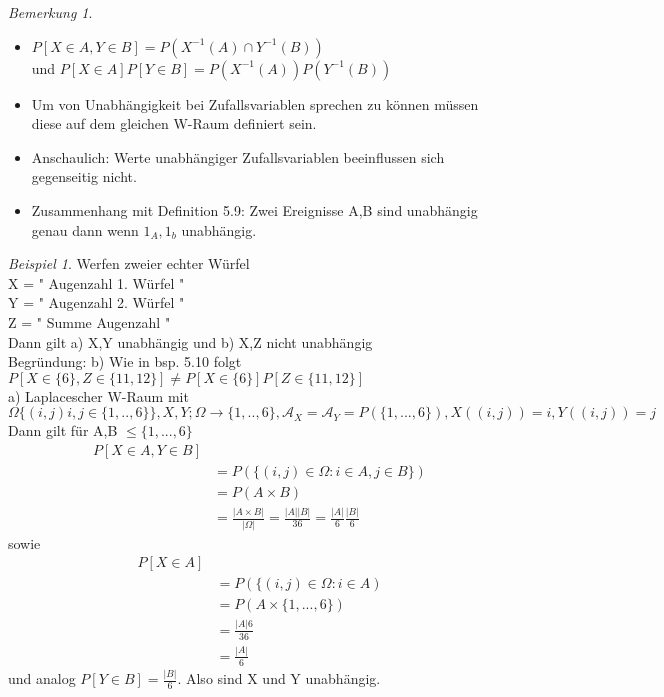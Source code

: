 \documentclass[a4paper,12pt,fleqn]{scrartcl}
\newcommand{\m}[1]{\mathcal{ #1 }}
\theoremstyle{definition}
\theoremstyle{plain}
\theoremstyle{remark}
\newtheorem*{bemerkung}{Bemerkung}
\newtheorem{beispiel}[definition]{Beispiel}
\begin{document}
\begin{bemerkung}
\begin{itemize}
\item $ P[X \in A , Y \in B] = P(X^{-1}(A) \cap Y^{-1}(B)) $ \\
 und $ P[X \in A]P[ Y \in B ] = P(X^{-1}(A))P(Y^{-1}(B)) $
\item Um von Unabhängigkeit bei Zufallsvariablen sprechen zu können müssen diese auf dem gleichen W-Raum definiert sein.
\item Anschaulich: Werte unabhängiger Zufallsvariablen beeinflussen sich gegenseitig nicht.
\item Zusammenhang mit Definition 5.9: Zwei Ereignisse A,B sind unabhängig genau dann wenn $1_A, 1_b$ unabhängig. 
\end{itemize}
\end{bemerkung}
\begin{beispiel}
Werfen zweier echter Würfel \\
X = " Augenzahl 1. Würfel " \\
Y = " Augenzahl 2. Würfel " \\
Z = " Summe Augenzahl " \\
Dann gilt a) X,Y unabhängig und b) X,Z nicht unabhängig \\
Begründung: b) Wie in bsp. 5.10 folgt $P[ X \in \{ 6 \} , Z \in \{ 11 , 12 \} ] \neq P[X \in \{ 6 \} ]P[Z \in \{ 11 , 12 \} ]$ \\
a) Laplacescher W-Raum mit $ \Omega \{ ( i,j) i,j \in \{ 1,..,6 \} \} , X,Y ; \Omega \rightarrow \{ 1,..,6 \} , \m{A}_X = \m{A}_Y = P( \{ 1,...,6 \} ) , X((i,j)) = i , Y((i,j))=j$ \\
Dann gilt für A,B $\leq \{1,...,6 \} $
\begin{align*}
P[X \in A , Y \in B] \\
&= P( \{ (i,j) \in \Omega : i \in A , j \in B \} ) \\
&= P( A \times B ) \\
&= \frac{| A \times B |}{| \Omega  |} = \frac{|A| |B|}{36} = \frac{|A|}{6} \frac{|B|}{6}
\end{align*} 
sowie 
\begin{align*}
P[X \in A] \\
&= P( \{ (i,j) \in \Omega : i \in A ) \\
&= P( A \times \{ 1,...,6 \} ) \\
&= \frac{|A| 6}{36} \\
&= \frac{|A|}{6}
\end{align*}
und analog $P[Y \in B] = \frac{|B|}{6}$. Also sind X und Y unabhängig.
\end{beispiel}
\end{document}

